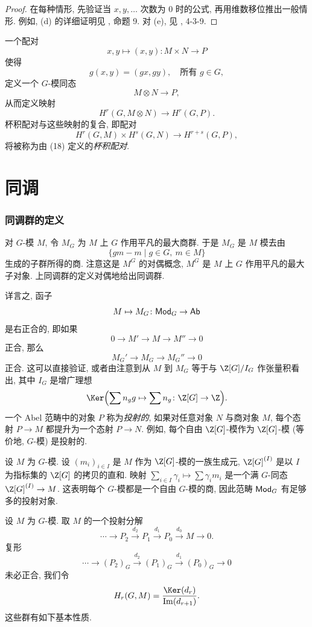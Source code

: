 \begin{proof}
在每种情形, 先验证当 $x,y,\ldots$ 次数为 $0$ 时的公式, 再用维数移位推出一般情形. 例如, (d) 的详细证明见 \cite{AtiyahWall1967}, 命题 9. 对 (e), 见 \cite{Weiss1969}, 4-3-9.
\end{proof}

一个配对
\begin{equation*}
 x,y\mapsto (x,y)\colon M\times N\to P
\tag{18}
\end{equation*}
使得
\[
 g(x,y)=(gx,gy),\quad\text{所有 }g\in G,
\]
定义一个 $G$-模同态
\[
 M\otimes N\to P,
\]
从而定义映射
\[
 H^r(G,M\otimes N)\to H^r(G,P).
\]
杯积配对与这些映射的复合, 即配对
\[
 H^r(G,M)\times H^s(G,N)\to H^{r+s}(G,P),
\]
将被称为由 (18) 定义的\emph{杯积配对}.

\section{同调}\label{sec:II.2}

\subsubsection*{同调群的定义}

对 $G$-模 $M$, 令 $M_G$ 为 $M$ 上 $G$ 作用平凡的最大商群. 于是 $M_G$ 是 $M$ 模去由
\[
 \{gm-m\mid g\in G,\ m\in M\}
\]
生成的子群所得的商. 注意这是 $M^G$ 的对偶概念, $M^G$ 是 $M$ 上 $G$ 作用平凡的最大子对象. 上同调群的定义对偶地给出同调群.

详言之, 函子
\[
 M\mapsto M_G\colon \mathsf{Mod}_G\to \mathsf{Ab}
\]
是右正合的, 即如果
\[
 0\to M'\to M\to M''\to 0
\]
正合, 那么
\[
 M_G'\to M_G\to M_G''\to 0
\]
正合. 这可以直接验证, 或者由注意到从 $M$ 到 $M_G$ 等于与 $\Z[G]/I_G$ 作张量积看出, 其中 $I_G$ 是增广理想
\[
 \Ker\Bigl(\sum n_g g\mapsto \sum n_g\colon \Z[G]\to\Z\Bigr).
\]
一个 Abel 范畴中的对象 $P$ 称为\emph{投射的}, 如果对任意对象 $N$ 与商对象 $M$, 每个态射 $P\to M$ 都提升为一个态射 $P\to N$. 例如, 每个自由 $\Z[G]$-模作为 $\Z[G]$-模 (等价地, $G$-模) 是投射的.

设 $M$ 为 $G$-模. 设 $(m_i)_{i\in I}$ 是 $M$ 作为 $\Z[G]$-模的一族生成元, $\Z[G]^{(I)}$ 是以 $I$ 为指标集的 $\Z[G]$ 的拷贝的直和. 映射 $\sum_{i\in I}\gamma_i\mapsto \sum \gamma_i m_i$ 是一个满 $G$-同态 $\Z[G]^{(I)}\to M$. 这表明每个 $G$-模都是一个自由 $G$-模的商, 因此范畴 $\mathsf{Mod}_G$ 有足够多的投射对象.

设 $M$ 为 $G$-模. 取 $M$ 的一个投射分解
\[
 \cdots\longrightarrow P_2\xrightarrow{d_2} P_1\xrightarrow{d_1} P_0\xrightarrow{d_0} M\longrightarrow 0.
\]
复形
\[
 \cdots\longrightarrow (P_2)_G\xrightarrow{d_2} (P_1)_G\xrightarrow{d_1} (P_0)_G\longrightarrow 0
\]
未必正合, 我们令
\[
 H_r(G,M)=\frac{\Ker(d_r)}{\Im(d_{r+1})}.
\]
这些群有如下基本性质.

